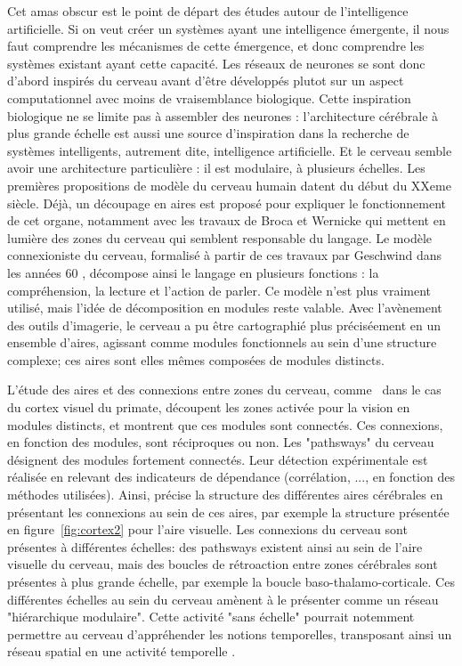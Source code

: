 Cet amas obscur est le point de départ des études autour de l’intelligence artificielle. Si on veut créer un systèmes ayant une intelligence émergente, il nous faut comprendre les mécanismes de cette émergence, et donc comprendre les systèmes existant ayant cette capacité. Les réseaux de neurones se sont donc d’abord inspirés du cerveau avant d’être développés plutot sur un aspect computationnel avec moins de vraisemblance biologique.
Cette inspiration biologique ne se limite pas à assembler des neurones : l’architecture cérébrale à plus grande échelle est aussi une source d’inspiration dans la recherche de systèmes intelligents, autrement dite, intelligence artificielle.  
Et le cerveau semble avoir une architecture particulière : il est modulaire, à plusieurs échelles. 
Les premières propositions de modèle du cerveau humain datent du début du XXeme siècle. Déjà, un découpage en aires est proposé pour expliquer le fonctionnement de cet organe, notamment avec les travaux de Broca et Wernicke qui mettent en lumière des zones du cerveau qui semblent responsable du langage. Le modèle connexioniste du cerveau, formalisé à partir de ces travaux par Geschwind dans les années 60 , décompose ainsi le langage en plusieurs fonctions : la compréhension, la lecture et l'action de parler. Ce modèle n'est plus vraiment utilisé, mais l'idée de décomposition en modules reste valable.
Avec l'avènement des outils d'imagerie, le cerveau a pu être cartographié plus préciséement en un ensemble d'aires, agissant comme modules fonctionnels au sein d'une structure complexe; ces aires sont elles mêmes composées de modules distincts. 

L'étude des aires et des connexions entre zones du cerveau, comme~\cite{primate_cortex_91} dans le cas du cortex visuel du primate, découpent les zones activée pour la vision en modules distincts, et montrent que ces modules sont connectés. Ces connexions, en fonction des modules, sont réciproques ou non. Les "pathsways" du cerveau désignent des modules fortement connectés. Leur détection expérimentale est réalisée en relevant des indicateurs de dépendance (corrélation, ..., en fonction des méthodes utilisées). Ainsi, \cite{Rolls2002ComputationalNO} précise la structure des différentes aires cérébrales en présentant les connexions au sein de ces aires, par exemple la structure présentée en figure~\ref{fig:cortex2} pour l'aire visuelle. 
Les connexions du cerveau sont présentes à différentes échelles: des pathsways existent ainsi au sein de l'aire visuelle du cerveau, mais des boucles de rétroaction entre zones cérébrales sont présentes à plus grande échelle, par exemple la boucle baso-thalamo-corticale. Ces différentes échelles au sein du cerveau amènent \cite{Meunier2010ModularAH} à le présenter comme un réseau "hiérarchique modulaire". Cette activité "sans échelle" pourrait notemment permettre au cerveau d'appréhender les notions temporelles, transposant ainsi un réseau spatial en une activité temporelle \cite{biyu_scale-free_2014}.

